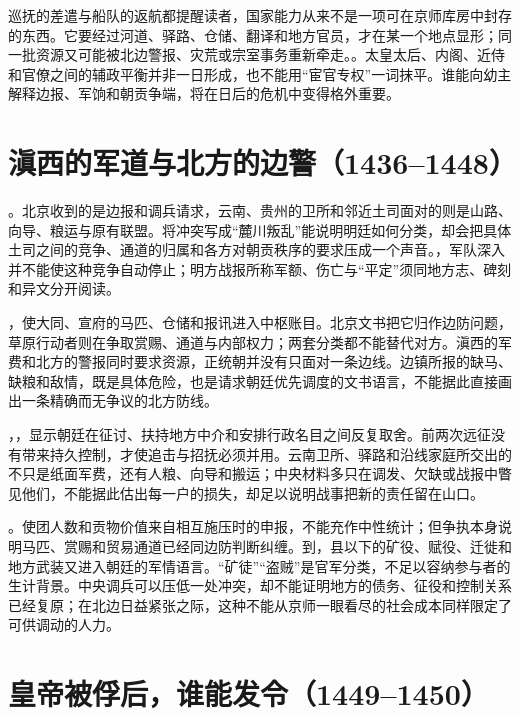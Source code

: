 巡抚的差遣与船队的返航都提醒读者，国家能力从来不是一项可在京师库房中封存的东西。它要经过河道、驿路、仓储、翻译和地方官员，才在某一个地点显形；同一批资源又可能被北边警报、灾荒或宗室事务重新牵走。。太皇太后、内阁、近侍和官僚之间的辅政平衡并非一日形成，也不能用“宦官专权”一词抹平。谁能向幼主解释边报、军饷和朝贡争端，将在日后的危机中变得格外重要。

\section{滇西的军道与北方的边警（1436--1448）}

。北京收到的是边报和调兵请求，云南、贵州的卫所和邻近土司面对的则是山路、向导、粮运与原有联盟。将冲突写成“麓川叛乱”能说明明廷如何分类，却会把具体土司之间的竞争、通道的归属和各方对朝贡秩序的要求压成一个声音。，军队深入并不能使这种竞争自动停止；明方战报所称军额、伤亡与“平定”须同地方志、碑刻和异文分开阅读。

，使大同、宣府的马匹、仓储和报讯进入中枢账目。北京文书把它归作边防问题，草原行动者则在争取赏赐、通道与内部权力；两套分类都不能替代对方。滇西的军费和北方的警报同时要求资源，正统朝并没有只面对一条边线。边镇所报的缺马、缺粮和敌情，既是具体危险，也是请求朝廷优先调度的文书语言，不能据此直接画出一条精确而无争议的北方防线。

，，显示朝廷在征讨、扶持地方中介和安排行政名目之间反复取舍。前两次远征没有带来持久控制，才使追击与招抚必须并用。云南卫所、驿路和沿线家庭所交出的不只是纸面军费，还有人粮、向导和搬运；中央材料多只在调发、欠缺或战报中瞥见他们，不能据此估出每一户的损失，却足以说明战事把新的责任留在山口。

。使团人数和贡物价值来自相互施压时的申报，不能充作中性统计；但争执本身说明马匹、赏赐和贸易通道已经同边防判断纠缠。到，县以下的矿役、赋役、迁徙和地方武装又进入朝廷的军情语言。“矿徒”“盗贼”是官军分类，不足以容纳参与者的生计背景。中央调兵可以压低一处冲突，却不能证明地方的债务、征役和控制关系已经复原；在北边日益紧张之际，这种不能从京师一眼看尽的社会成本同样限定了可供调动的人力。
\section{皇帝被俘后，谁能发令（1449--1450）}

